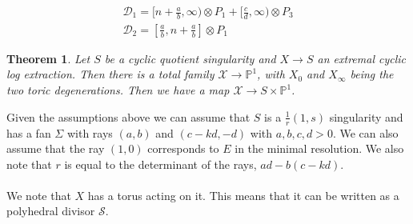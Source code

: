 \documentclass[11pt]{amsart}
\theoremstyle{plain}
\newtheorem{thm}{Theorem}[section]
\newcommand{\mb}[1]{\mathbb{#1}}
\newcommand{\ra}{\rightarrow}
\begin{document}
\[
\begin{array}{l}
\mathcal{D}_1 = [ n + \frac{a}{b}, \infty) \otimes P_1 + [\frac{c}{d}, \infty) \otimes P_3 \\
\mathcal{D}_2 =  [\frac{a}{b}, n + \frac{a}{b}] \otimes P_1
\end{array}
\]
\newline
\begin{thm}
Let $S$ be a cyclic quotient singularity and $X \ra S$ an extremal cyclic log extraction. Then there is a total family $\mathcal{X} \ra \mb{P}^1$, with $X_0$ and $X_\infty$ being the two toric degenerations. Then we have a map $\mathcal{X} \ra S \times \mb{P}^1$.
\end{thm}
\vspace{0.1cm}
Given the assumptions above we can assume that $S$ is a $\frac{1}{r}(1,s)$ singularity and has a fan $\Sigma$ with rays $(a,b)$ and $(c-kd,-d)$ with $a,b,c,d  > 0$. We can also assume that the ray $(1,0)$ corresponds to $E$ in the minimal resolution. We also note that $r$ is equal to the determinant of the rays, $ad - b(c-kd)$. 
\\
\\
We note that $X$ has a torus acting on it. This means that it can be written as a polyhedral divisor $\mathcal{S}$.
\begin{comment}
\begin{figure}[htbp]
\psset{unit=0.95cm}
\begin{pspicture}(0,-6)(12,0)
\psframe[linecolor=white](0.5,-4.5)(3.5,-1.5)


\psline{<-|}(6,-3)(7.5,-3)
\psline{|->}(7.5,-3)(10,-3)
\rput[bl]{0}(11,-3){$\mathcal{S}_1$}
\uput*[270](7.6,-3.1){${\tiny \frac{a}{b}}$}

\psline{<-|}(6,-1.8)(7.25,-1.8)
\psline{-|}(7.25,-1.8)(8,-1.8)
\psline{->}(8,-1.8)(10,-1.8)
\uput*[270](7.2,-1.9){${\tiny {0}}$}
\uput*[270](8,-1.9){${\tiny{k}}$}
\rput[bl]{0}(11,-1.8){$\mathcal{S}_0$}
\rput[bl]{0}(9,-1.6){$\mathcal{D}_{\sigma_0}$}
\rput[bl]{0}(7.3,-1.6){$\mathcal{D}_{\sigma_1}$}


\psline{<-|}(6,-4.2)(9,-4.2)
\psline{|->}(9,-4.2)(10,-4.2)
\uput*[270](8.9,-4.3){${\tiny \frac{c-kd}{d}}$}
\rput[bl]{0}(11,-4.2){$\mathcal{S}_{\infty}$}
\rput[bl]{0}(9,-4){$\mathcal{D}_{\sigma_0}$}
\rput[bl]{0}(8,-5.5){$\mathcal{S}$}

\psline{|->}(5,-3)(5,-1)
\psline{|->}(5,-3)(5,-5)
\rput[bl]{0}(4.5,-5.5){$Y=\mathbb{P}^1$}


\end{pspicture}
\caption{Divisorial fan associated to $X$.}
\end{figure}
\end{comment}
\end{document}
